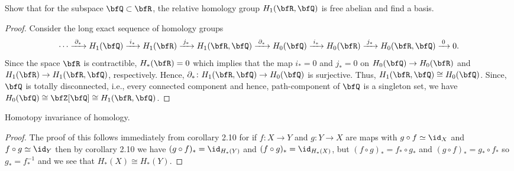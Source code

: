 \begin{problem}[Hatcher {\S}2.1, Ex.\,18]
Show that for the subspace $\bfQ\subset\bfR$, the relative homology group
$H_1(\bfR,\bfQ)$ is free abelian and find a basis.
\end{problem}
\begin{proof}
Consider the long exact sequence of homology groups
\begin{equation}
  \label{eq:relative-short-exact-sequence-3}
\cdots\xrightarrow{\;\partial_*\;}
H_1(\bfQ)\xrightarrow{\;i_*\;}
H_1(\bfR)\xrightarrow{\;j_*\;}
H_1(\bfR,\bfQ)\xrightarrow{\;\partial_*\;}
H_0(\bfQ)\xrightarrow{\;i_*\;}
H_0(\bfR)\xrightarrow{\;j_*\;}
H_0(\bfR,\bfQ)\xrightarrow{\;0\;}0.
\end{equation}
Since the space $\bfR$ is contractible, $H_*(\bfR)=0$ which implies that
the map $i_*=0$ and $j_*=0$ on $H_0(\bfQ)\to H_0(\bfR)$ and $H_1(\bfR)\to
H_1(\bfR,\bfQ)$, respectively. Hence, $\partial_*\colon H_1(\bfR,\bfQ)\to
H_0(\bfQ)$ is surjective. Thus, $H_1(\bfR,\bfQ)\cong H_0(\bfQ)$. Since,
$\bfQ$ is totally disconnected, i.e., every connected component and hence,
path-component of $\bfQ$ is a singleton set, we have
$H_0(\bfQ)\cong \bfZ[\bfQ]\cong H_1(\bfR,\bfQ)$.
\end{proof}

\newpage
\begin{problem}
Homotopy invariance of homology.
\end{problem}
\begin{proof}
The proof of this follows immediately from corollary 2.10 for if $f\colon
X\to Y$ and $g\colon Y\to X$ are maps with $g\circ f\simeq\id_X$ and
$f\circ g\simeq \id_Y$ then by corollary 2.10 we have $(g\circ
f)_*=\id_{H_*(Y)}$ and $(f\circ g)_*=\id_{H_*(X)}$, but $(f\circ
g)_*=f_*\circ g_*$ and $(g\circ f)_*=g_*\circ f_*$ so $g_*=f_*^{-1}$ and we
see that $H_*(X)\cong H_*(Y)$.
\end{proof}

